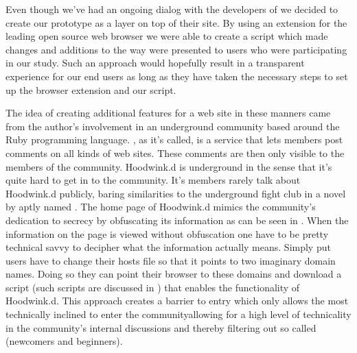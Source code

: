Even though we've had an ongoing dialog with the developers of \urort{} we
decided to create our prototype as a layer on top of their site.
By using an
extension
for the leading open source%
web browser we were able to create a script which
made changes and additions to the way \urort{}
were presented to users who were participating in our study.
Such an approach would hopefully result in a transparent experience for our
end users as long as they have taken the necessary steps to set up the browser
extension and our script.

The idea of creating additional features for a web site in these manners
came from the author's involvement in an underground community based around
the Ruby%
programming language. %
,
as it's called, is a service that lets members post comments on all kinds of
web sites. These comments are then only visible to the members of the
community.
Hoodwink.d is underground in the sense that it's quite hard to get in to
the community. It's members rarely talk about Hoodwink.d publicly, baring
similarities to the underground fight club in a novel by \citet{palahniuk96}
aptly named %
.
The home page of Hoodwink.d mimics the community's dedication to secrecy
by obfuscating its information as can be seen in
.
When the information on the page is viewed without obfuscation%
one have to be pretty technical savvy to decipher what the information 
actually means. Simply put users have to change their hosts file
so that it points to two imaginary domain names. Doing so they can point their
browser to these domains and download a script (such scripts are discussed in
)
that enables the functionality
of Hoodwink.d.%
This approach creates a barrier to entry which only allows the most
technically inclined to enter the community\dash{}allowing for a
high level of technicality in the community's internal discussions
and thereby filtering out so called 
(newcomers and beginners).

